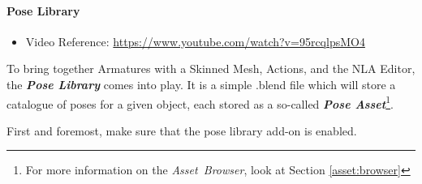 \documentclass{article}
\begin{document}
\paragraph{Pose Library}
\begin{itemize}[noitemsep, topsep=0pt]
    \item Video Reference: \url{https://www.youtube.com/watch?v=95rcqlpsMO4}
\end{itemize}
To bring together Armatures with a Skinned Mesh, Actions, and the NLA Editor, the \textbf{\textit{Pose Library}} comes into play. It is a simple .blend file which will store a catalogue of poses for a 
given object, each stored as a so-called \textit{\textbf{Pose Asset}}\footnote{For more information on the \mbox{\textit{Asset Browser}}, look at Section \ref{asset:browser}}.\par
First and foremost, make sure that the pose library add-on is enabled.\par
\end{document}
